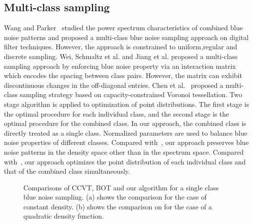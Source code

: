 \subsection{Multi-class sampling}
Wang and Parker~ studied the power spectrum characteristics of combined blue noise patterns and proposed a multi-class blue noise sampling approach on digital filter techniques.
However, the approach is constrained to uniform,regular and discrete sampling.
Wei, Schmaltz et al. and Jiang et al. proposed a multi-class sampling
approach by enforcing blue noise property via an interaction matrix which
encodes the spacing between class pairs.
However, the matrix can exhibit discontinuous changes in the off-diagonal entries.
Chen et al.~ proposed a multi-class sampling strategy based on capacity-constrained Voronoi tessellation.
Two stage algorithm
 is applied to optimization of point distributions.
The first stage is the optimal procedure for each individual class,
and the second stage is the optimal procedure for the combined class.
In our approach,
the combined class is directly treated as a single class.
Normalized parameters are used to balance blue noise properties of different classes.
Compared with~\cite{Wang:1999:BlueNoise},
our approach preserves blue noise patterns in the density space other than in the spectrum space.
Compared with~\cite{chen:2012:variational},
our approach optimizes the point distribution of each individual class and that of the combined class simultaneously.

\begin{figure}[htb]
\centering
{}
\caption{
Comparisons of CCVT, BOT and our algorithm for a single class blue noise sampling.
(a) shows the comparison for the case of constant density.
(b) shows the comparison on for the case of a quadratic density function. }
\label{one-class-sampling}
\end{figure}


